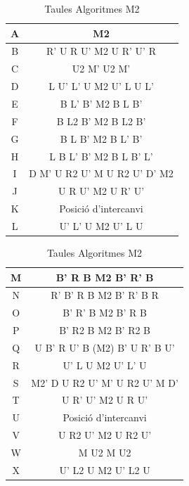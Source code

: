 \begin{table}[h]
    \begin{minipage}{.5\linewidth}
        \centering
        \begin{tabular}{|c|c|}
            \hline
            A & M2 \\
            \hline
            B & R' U R U' M2 U R' U' R \\
            \hline
            C & U2 M' U2 M' \\
            \hline
            D & L U' L' U M2 U' L U L'  \\
            \hline
            E & B L' B' M2 B L B'  \\
            \hline
            F & B L2 B' M2 B L2 B' \\
            \hline
            G & B L B' M2 B L' B' \\
            \hline
            H & L B L' B' M2 B L B' L' \\
            \hline
            I & D M' U R2 U' M U R2 U' D' M2 \\
            \hline
            J & U R U' M2 U R' U' \\
            \hline
            K & Posició d'intercanvi \\
            \hline
            L & U' L' U M2 U' L U \\
            \hline 
        \end{tabular}
    \end{minipage}
    \begin{minipage}{.5\linewidth}
        \centering
        \begin{tabular}{|c|c|}
            \hline
             M & B' R B M2 B' R' B \\
             \hline
             N & R' B' R B M2 B' R' B R  \\
             \hline
             O & B' R' B M2 B' R B \\
             \hline
             P & B' R2 B M2 B' R2 B \\
             \hline
             Q & U B' R U' B (M2) B' U R' B U' \\
             \hline
             R & U' L U M2 U' L' U \\
             \hline
             S & M2' D U R2 U' M' U R2 U' M D' \\
             \hline
             T & U R' U' M2 U R U'  \\
             \hline
             U & Posició d'intercanvi \\
             \hline
             V & U R2 U' M2 U R2 U' \\
             \hline
             W & M U2 M U2  \\
             \hline
             X & U' L2 U M2 U' L2 U \\
             \hline 
        \end{tabular}
    \end{minipage} 
    \caption{Taules Algoritmes M2}
    \label{tla:m2c}
\end{table}

